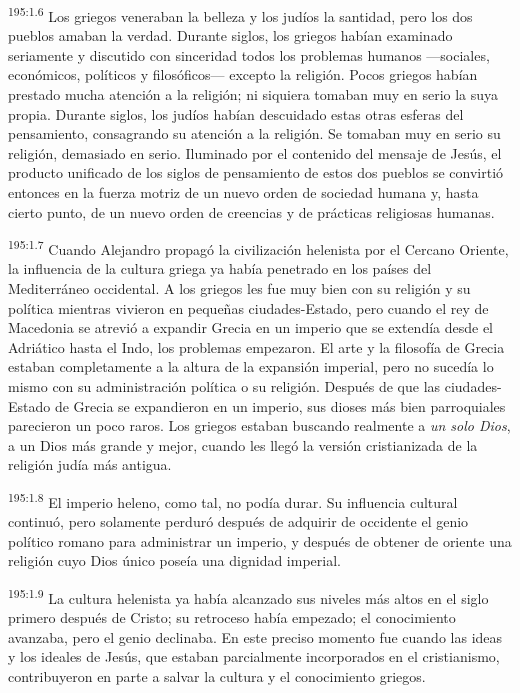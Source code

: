 \par
\textsuperscript{195:1.6} Los griegos veneraban la belleza y los judíos la santidad, pero los dos pueblos amaban la verdad. Durante siglos, los griegos habían examinado seriamente y discutido con sinceridad todos los problemas humanos ---sociales, económicos, políticos y filosóficos--- excepto la religión. Pocos griegos habían prestado mucha atención a la religión; ni siquiera tomaban muy en serio la suya propia. Durante siglos, los judíos habían descuidado estas otras esferas del pensamiento, consagrando su atención a la religión. Se tomaban muy en serio su religión, demasiado en serio. Iluminado por el contenido del mensaje de Jesús, el producto unificado de los siglos de pensamiento de estos dos pueblos se convirtió entonces en la fuerza motriz de un nuevo orden de sociedad humana y, hasta cierto punto, de un nuevo orden de creencias y de prácticas religiosas humanas.

\par
\textsuperscript{195:1.7} Cuando Alejandro propagó la civilización helenista por el Cercano Oriente, la influencia de la cultura griega ya había penetrado en los países del Mediterráneo occidental. A los griegos les fue muy bien con su religión y su política mientras vivieron en pequeñas ciudades-Estado, pero cuando el rey de Macedonia se atrevió a expandir Grecia en un imperio que se extendía desde el Adriático hasta el Indo, los problemas empezaron. El arte y la filosofía de Grecia estaban completamente a la altura de la expansión imperial, pero no sucedía lo mismo con su administración política o su religión. Después de que las ciudades-Estado de Grecia se expandieron en un imperio, sus dioses más bien parroquiales parecieron un poco raros. Los griegos estaban buscando realmente a \textit{un solo Dios}, a un Dios más grande y mejor, cuando les llegó la versión cristianizada de la religión judía más antigua.

\par
\textsuperscript{195:1.8} El imperio heleno, como tal, no podía durar. Su influencia cultural continuó, pero solamente perduró después de adquirir de occidente el genio político romano para administrar un imperio, y después de obtener de oriente una religión cuyo Dios único poseía una dignidad imperial.

\par
\textsuperscript{195:1.9} La cultura helenista ya había alcanzado sus niveles más altos en el siglo primero después de Cristo; su retroceso había empezado; el conocimiento avanzaba, pero el genio declinaba. En este preciso momento fue cuando las ideas y los ideales de Jesús, que estaban parcialmente incorporados en el cristianismo, contribuyeron en parte a salvar la cultura y el conocimiento griegos.

